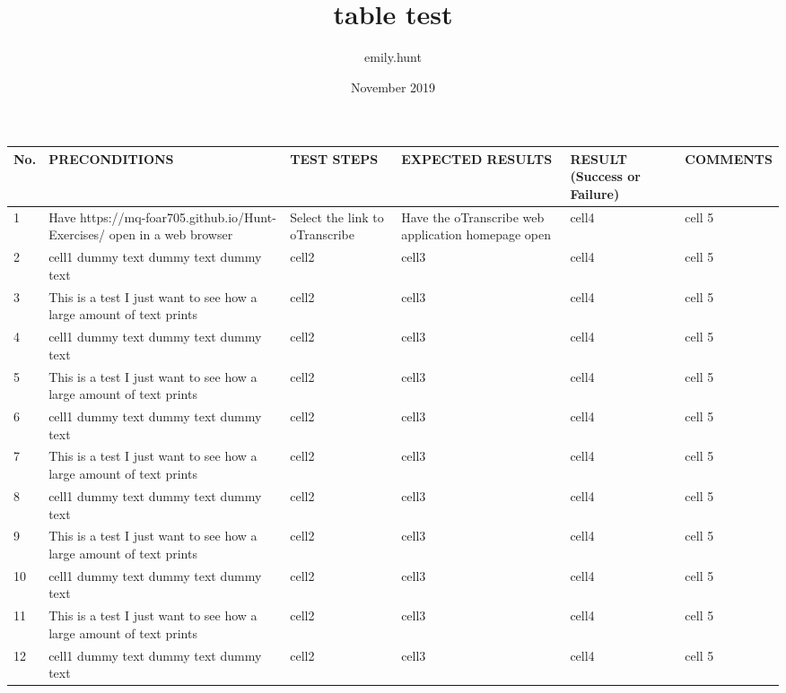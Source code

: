 \documentclass{article}
\title{table test}
\author{emily.hunt }
\date{November 2019}
\begin{document}
\maketitle


\begin{tabular}{ | m{0.4cm} | m{3.5cm} | m{4cm}| m{4cm} | m{2
cm} | m{3.5cm} | } 
\hline
No. & PRECONDITIONS & TEST STEPS & EXPECTED RESULTS & RESULT (Success or Failure) & COMMENTS\\ 
\hline
1 & Have https://mq-foar705.github.io/Hunt-Exercises/ open in a web browser & Select the link to oTranscribe & Have the oTranscribe web application homepage open & cell4 & cell 5 \\ 
\hline
2 & cell1 dummy text dummy text dummy text& cell2 & cell3 & cell4 & cell 5 \\ 
\hline
3 & This is a test I just want to see how a large amount of text prints & cell2 & cell3 & cell4 & cell 5 \\ 
\hline
4 & cell1 dummy text dummy text dummy text& cell2 & cell3 & cell4 & cell 5 \\ 
\hline
5 & This is a test I just want to see how a large amount of text prints & cell2 & cell3 & cell4 & cell 5 \\ 
\hline
6 & cell1 dummy text dummy text dummy text& cell2 & cell3 & cell4 & cell 5 \\ 
\hline
7 & This is a test I just want to see how a large amount of text prints & cell2 & cell3 & cell4 & cell 5 \\ 
\hline
8 & cell1 dummy text dummy text dummy text& cell2 & cell3 & cell4 & cell 5 \\ 
\hline
9 & This is a test I just want to see how a large amount of text prints & cell2 & cell3 & cell4 & cell 5 \\ 
\hline 
10 & cell1 dummy text dummy text dummy text& cell2 & cell3 & cell4 & cell 5 \\ 
\hline
11 & This is a test I just want to see how a large amount of text prints & cell2 & cell3 & cell4 & cell 5 \\ 
\hline
12 & cell1 dummy text dummy text dummy text& cell2 & cell3 & cell4 & cell 5 \\ 
\hline
\end{tabular}

\pagebreak
\end{document}
